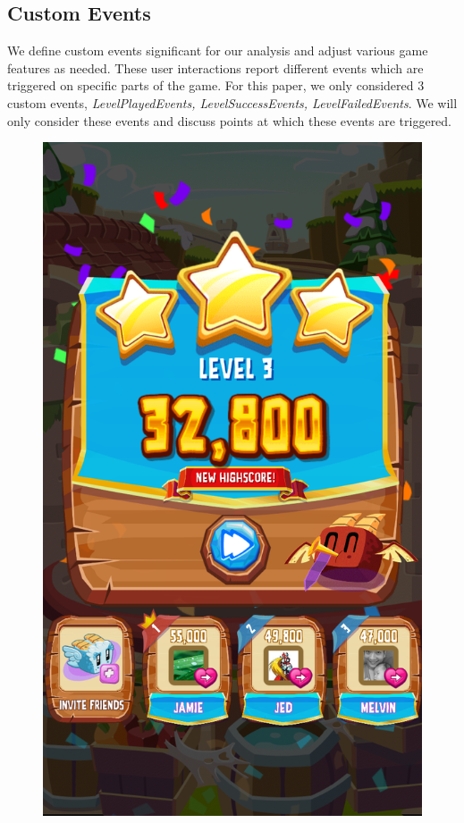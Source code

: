 \subsection{Custom Events}
We define custom events significant for our analysis and adjust various game features as needed. These user interactions report different events which are triggered on specific parts of the game. For this paper, we only considered 3 custom events, \textit{LevelPlayedEvents, LevelSuccessEvents, LevelFailedEvents}. We will only consider these events and discuss points at which these events are triggered.

\begin{figure}[h]
\centering
\includegraphics[scale=0.16]{figures/dnc_win.png} 

\end{figure}
